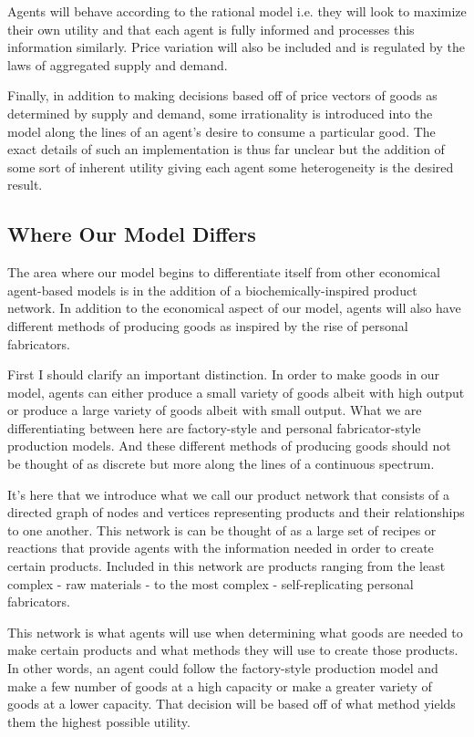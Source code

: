 \documentclass[11pt,letterpaper]{article}
\begin{document}
Agents will behave according to the rational model i.e. they will look to maximize their own utility and that each agent is fully informed and processes this information similarly. Price variation will also be included and is regulated by the laws of aggregated supply and demand.

Finally, in addition to making decisions based off of price vectors of goods as determined by supply and demand, some irrationality is introduced into the model along the lines of an agent's desire to consume a particular good. The exact details of such an implementation is thus far unclear but the addition of some sort of inherent utility giving each agent some heterogeneity is the desired result.

\subsection*{Where Our Model Differs}

The area where our model begins to differentiate itself from other economical agent-based models is in the addition of a biochemically-inspired product network. In addition to the economical aspect of our model, agents will also have different methods of producing goods as inspired by the rise of personal fabricators.

First I should clarify an important distinction. In order to make goods in our model, agents can either produce a small variety of goods albeit with high output or produce a large variety of goods albeit with small output. What we are differentiating between here are factory-style and personal fabricator-style production models. And these different methods of producing goods should not be thought of as discrete but more along the lines of a continuous spectrum.

It's here that we introduce what we call our product network that consists of a directed graph of nodes and vertices representing products and their relationships to one another. This network is can be thought of as a large set of recipes or reactions that provide agents with the information needed in order to create certain products. Included in this network are products ranging from the least complex - raw materials - to the most complex - self-replicating personal fabricators. 

This network is what agents will use when determining what goods are needed to make certain products and what methods they will use to create those products. In other words, an agent could follow the factory-style production model and make a few number of goods at a high capacity or make a greater variety of goods at a lower capacity. That decision will be based off of what method yields them the highest possible utility.
\end{document}
